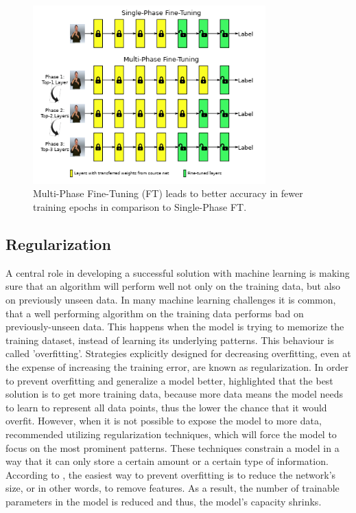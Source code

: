 \begin{figure}[H]
  \begin{center}
  \includegraphics[angle=0, width=0.8\textwidth]{Figures/MultiPhaseFT.PNG}
  \caption{Multi-Phase Fine-Tuning (FT) leads to better accuracy in fewer training epochs in comparison to Single-Phase FT.}
  \label{fig:MultiPhaseFT}
  \end{center}
\end{figure}

\subsection{Regularization}
A central role in developing a successful solution with machine learning is making sure that an algorithm will perform well not only on the training data, but also on previously unseen data. In many machine learning challenges it is common, that a well performing algorithm on the training data performs bad on previously-unseen data. This happens when the model is trying to memorize the training dataset, instead of learning its underlying patterns. This behaviour is called 'overfitting'. Strategies explicitly designed for decreasing overfitting, even at the expense of increasing the training error, are known as regularization. \citep{Goodfellow:2016:DeepLearning}
\newline\newline
In order to prevent overfitting and generalize a model better, \citet{Chollet:2017:DeepLearningPython} highlighted that the best solution is to get more training data, because more data means the model needs to learn to represent all data points, thus the lower the chance that it would overfit. However, when it is not possible to expose the model to more data, \citet{Chollet:2017:DeepLearningPython} recommended utilizing regularization techniques, which will force the model to focus on the most prominent patterns. These techniques constrain a model in a way that it can only store a certain amount or a certain type of information. According to \citet{Chollet:2017:DeepLearningPython}, the easiest way to prevent overfitting is to reduce the network's size, or in other words, to remove features. As a result, the number of trainable parameters in the model is reduced and thus, the model's capacity shrinks.

